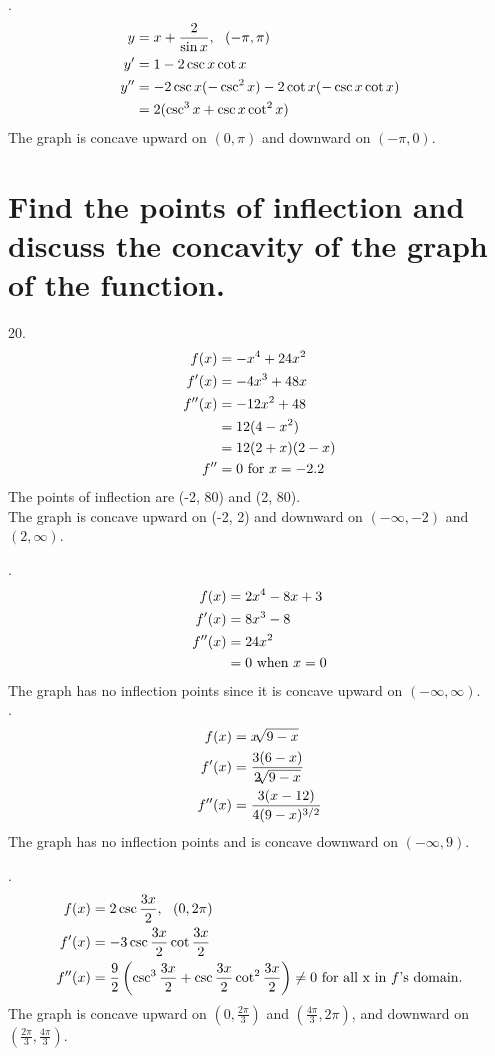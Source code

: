 \documentclass[11pt]{article}
\newcommand*{\vs}{\vspace{1cm}}
\newcommand*{\next}{\noindent}
\newcommand*{\set}{\setcounter{equation}{0}}
\begin{document}
\vs
\next
18.\begin{align}
    \set
    y&=x+\frac{2}{\sin x},\,\,\,\,(-\pi, \pi)\\
    y'&=1-2\csc x\cot x\\
    y''&=-2\csc x(-\csc^2x)-2\cot x(-\csc x\cot x)\\
    &=2(\csc^3x+\csc x\cot^2 x)
\end{align}
The graph is concave upward on $(0, \pi)$ and downward on $(-\pi, 0)$.

\section{Find the points of inflection and discuss the concavity of the graph of the function.}
20.\begin{align}
    \set
   f(x)&=-x^4+24x^2\\
   f'(x)&=-4x^3+48x\\
   f''(x)&=-12x^2+48\\
   &=12(4-x^2)\\
   &=12(2+x)(2-x)\\
   f''&=0\,\,\text{for}\,\, x=-2. 2
\end{align}
The points of inflection are (-2, 80) and (2, 80).\\
The graph is concave upward on (-2, 2) and downward on $(-\infty, -2)$ and $(2, \infty)$.

\vs
\next
24.\begin{align}
    \set
    f(x)&=2x^4-8x+3\\
    f'(x)&=8x^3-8\\
    f''(x)&=24x^2\\
    &=0\,\,\text{when}\,\, x=0
\end{align}
The graph has no inflection points since it is concave upward on $(-\infty, \infty)$.\\

\vs
\next
28.\begin{align}
    \set
    f(x)&=x\sqrt[]{9-x}\\
    f'(x)&=\frac{3(6-x)}{2\sqrt[]{9-x}}\\
    f''(x)&=\frac{3(x-12)}{4(9-x)^{3/2}}
\end{align}
The graph has no inflection points and is concave downward on $(-\infty, 9)$.

\vs
\next
32.\begin{align}
    \set
    f(x)&=2\csc\frac{3x}{2},\,\,\,\,(0, 2\pi)\\
    f'(x)&=-3\csc\frac{3x}{2}\cot\frac{3x}{2}\\
    f''(x)&=\frac{9}{2}\left(\csc^3\frac{3x}{2}+\csc\frac{3x}{2}\cot^2\frac{3x}{2}\right)\neq 0\,\,\text{for all x in $f$'s domain.} 
\end{align}
The graph is concave upward on $\left(0, \frac{2\pi}{3}\right)$ and $\left(\frac{4\pi}{3}, 2\pi\right)$, and downward on $\left(\frac{2\pi}{3}, \frac{4\pi}{3}\right)$.
\end{document}
